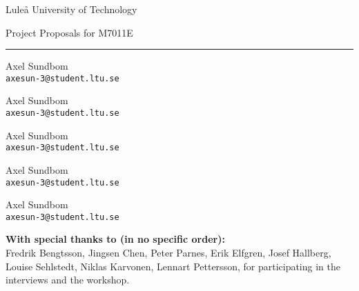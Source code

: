 \centering

{\Huge Luleå University of Technology}\par
\vspace{1ex}
{\Large Project Proposals for M7011E}\par
\rule{.5\textwidth}{.4pt}

\vspace{4ex}
\begin{minipage}{.3\textwidth}
\raggedright
Axel Sundbom\\
\texttt{axesun-3@student.ltu.se}
\end{minipage}
\begin{minipage}{.3\textwidth}
\raggedleft
Axel Sundbom\\
\texttt{axesun-3@student.ltu.se}
\end{minipage}

\vspace{4ex}
\begin{minipage}{.3\textwidth}
\raggedright
Axel Sundbom\\
\texttt{axesun-3@student.ltu.se}
\end{minipage}
\begin{minipage}{.3\textwidth}
\raggedleft
Axel Sundbom\\
\texttt{axesun-3@student.ltu.se}
\end{minipage}

\vspace{4ex}
\begin{minipage}{.3\textwidth}
\centering
Axel Sundbom\\
\texttt{axesun-3@student.ltu.se}
\end{minipage}

\vspace{12ex}
\begin{abstract}
This document describes some programming project assignments for the course M7011E that came out of a fifth year project for computer engineering students. Most of these assignments are results of interviews with examiners and suggestions from a workshop that was heldas a part of the pre-study. You may redistribute this document under the terms and agreements of the MIT license.
\end{abstract}

\tableofcontents
\vfill
\textbf{With special thanks to (in no specific order):}\\
Fredrik Bengtsson, Jingsen Chen, Peter Parnes, Erik Elfgren, Josef Hallberg, Louise Sehlstedt, Niklas Karvonen, Lennart Pettersson, for participating in the interviews and the workshop.
